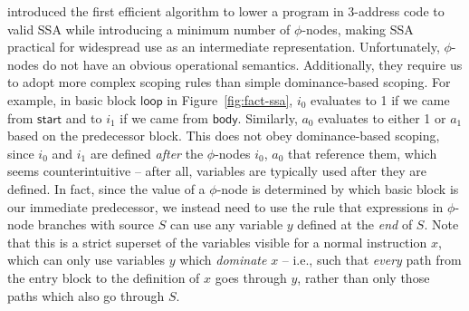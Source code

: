 \documentclass[acmsmall,screen,review]{acmart}
\newcommand{\ms}[1]{\ensuremath{\mathsf{#1}}}
\begin{document}
\citet{cytron-ssa-intro-91} introduced the first efficient algorithm to lower a program in 3-address
code to valid SSA while introducing a minimum number of $\phi$-nodes, making SSA practical for
widespread use as an intermediate representation. Unfortunately, $\phi$-nodes do not have an obvious
operational semantics. Additionally, they require us to adopt more complex scoping rules than simple
dominance-based scoping. For example, in basic block \ms{loop} in Figure~\ref{fig:fact-ssa}, $i_0$
evaluates to 1 if we came from \ms{start} and to $i_1$ if we came from \ms{body}. Similarly, $a_0$
evaluates to either 1 or $a_1$ based on the predecessor block. This does not obey dominance-based
scoping, since $i_0$ and $i_1$ are defined \emph{after} the $\phi$-nodes $i_0$, $a_0$ that reference
them, which seems counterintuitive -- after all, variables are typically used after they are
defined. In fact, since the value of a $\phi$-node is determined by which basic block is our
immediate predecessor, we instead need to use the rule that expressions in $\phi$-node branches with
source $S$ can use any variable $y$ defined at the \emph{end} of $S$. Note that this is a strict
superset of the variables visible for a normal instruction $x$, which can only use variables $y$
which \emph{dominate} $x$ -- i.e., such that \emph{every} path from the entry block to the
definition of $x$ goes through $y$, rather than only those paths which also go through $S$.
\end{document}

